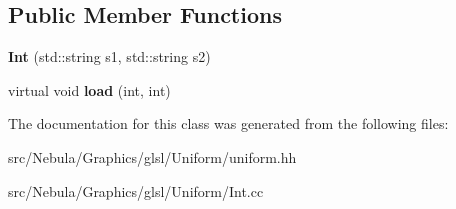 \subsection*{\-Public \-Member \-Functions}
\begin{DoxyCompactItemize}
\item 
\hypertarget{classNeb_1_1glsl_1_1Uniform_1_1Vector_1_1Int_a48b39d8547200b58574b24e47a921979}{{\bfseries \-Int} (std\-::string s1, std\-::string s2)}\label{classNeb_1_1glsl_1_1Uniform_1_1Vector_1_1Int_a48b39d8547200b58574b24e47a921979}

\item 
\hypertarget{classNeb_1_1glsl_1_1Uniform_1_1Vector_1_1Int_ad6b47e720ddda93b9c31ea544c28a3d6}{virtual void {\bfseries load} (int, int)}\label{classNeb_1_1glsl_1_1Uniform_1_1Vector_1_1Int_ad6b47e720ddda93b9c31ea544c28a3d6}

\end{DoxyCompactItemize}


\-The documentation for this class was generated from the following files\-:\begin{DoxyCompactItemize}
\item 
src/\-Nebula/\-Graphics/glsl/\-Uniform/uniform.\-hh\item 
src/\-Nebula/\-Graphics/glsl/\-Uniform/\-Int.\-cc\end{DoxyCompactItemize}
